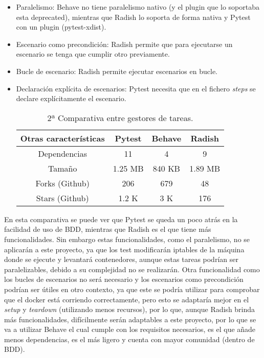 \begin{itemize}
    \item Paralelismo: Behave no tiene paralelismo nativo (y el plugin que lo soportaba esta deprecated), mientras que Radish lo soporta de forma nativa y Pytest con un plugin (pytest-xdist).
    \item Escenario como precondición: Radish permite que para ejecutarse un escenario se tenga que cumplir otro previamente.
    \item Bucle de escenario: Radish permite ejecutar escenarios en bucle.
    \item Declaración explícita de escenarios: Pytest necesita que en el fichero \textit{steps} se declare explícitamente el escenario.
    \begin{table}[H]
        \centering
        \begin{adjustbox}{width=\textwidth, totalheight=\textheight, keepaspectratio}
            \begin{tabular}{|c|c|c|c|}
            \hline
            Otras características & Pytest & Behave & Radish \\
            \hline
            Dependencias & 11 & 4 & 9 \\
            \hline
            Tamaño & 1.25 MB & 840 KB & 1.89 MB \\
            \hline
            Forks (Github) & 206 & 679 & 48 \\
            \hline
            Stars (Github) & 1.2 K & 3 K & 176 \\
            \hline
            \end{tabular}
        \end{adjustbox}
            \caption{2ª Comparativa entre gestores de tareas.}
    \end{table}
\end{itemize}


En esta comparativa se puede ver que Pytest se queda un poco atrás en la facilidad de uso de BDD, mientras que Radish es el que tiene más funcionalidades. Sin embargo estas funcionalidades, como el paralelismo, no se aplicarán a este proyecto, ya que los test modificarán iptables de la máquina donde se ejecute y levantará contenedores, aunque estas tareas podrían ser paralelizables, debido a su complejidad no se realizarán. Otra funcionalidad como los bucles de escenarios no será necesario y los escenarios como precondición podrían ser útiles en otro contexto, ya que este se podría utilizar para comprobar que el docker está corriendo correctamente, pero esto se adaptaría mejor en el \textit{setup} y \textit{teardown} (utilizando menos recursos), por lo que, aunque Radish brinda más funcionalidades, difícilmente serán adaptables a este proyecto, por lo que se va a utilizar Behave el cual cumple con los requisitos necesarios, es el que añade menos dependencias, es el más ligero y cuenta con mayor comunidad (dentro de BDD).


